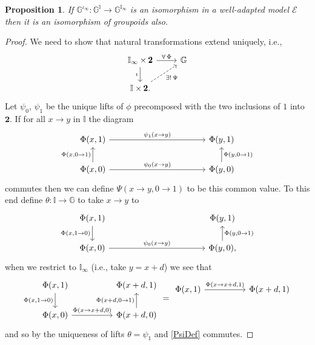 \documentclass[pdftex]{sigma}
\numberwithin{equation}{section}
\newtheorem{Proposition}[Theorem]{Proposition}
{ \theoremstyle{definition}
\newtheorem{Definition}[Theorem]{Definition}
\newtheorem{Notation}[Theorem]{Notation}
\newtheorem{Example}[Theorem]{Example}
\newtheorem{Remark}[Theorem]{Remark} }
\begin{document}
\begin{Proposition}\label{prop:groupoid-enriched-integration}
If $\mathbb{G}^{\iota_{\infty}}\colon \mathbb{G}^{\mathbb{I}}\rightarrow\mathbb{G}^{\mathbb{I}_{\infty}}$ is an isomorphism in a well-adapted model $\mathcal{E}$ then it is an isomorphism of groupoids also.
\end{Proposition}
\begin{proof}
We need to show that natural transformations extend uniquely, i.e.,
\begin{equation*}\begin{tikzcd}
\mathbb{I}_{\infty}\times\pmb{2} \rar{\forall\,\Phi} \dar[swap]{\iota} & \mathbb{G} \\
\mathbb{I}\times\pmb{2}. \urar[dashed][swap]{\exists!\,\Psi} &
\end{tikzcd}
\end{equation*}
Let $\psi_{0}$, $\psi_{1}$ be the unique lifts of $\phi$ precomposed with the two inclusions of $1$ into $\pmb{2}$. If for all $x\rightarrow y$ in $\mathbb{I}$ the diagram
\begin{equation}\label{PsiDef}
	\begin{tikzcd}[column sep=4cm]
\Phi(x,1) \rar{\psi_{1}(x\rightarrow y)} \dar[leftarrow,swap]{\Phi(x,0\rightarrow 1)} & \Phi(y,1) \dar[leftarrow]{\Phi(y,0\rightarrow 1)} \\
\Phi(x,0) \rar{\psi_{0}(x\rightarrow y)} & \Phi(y,0)
\end{tikzcd}
\end{equation}
commutes then we can def\/ine $\Psi(x\rightarrow y,0\rightarrow 1)$ to be this common value. To this end def\/ine $\theta\colon \mathbb{I}\rightarrow \mathbb{G}$ to take $x\rightarrow y$ to
\begin{equation*}\begin{tikzcd}[column sep=4cm]
\Phi(x,1) \dar[swap]{\Phi(x,1\rightarrow 0)} & \Phi(y,1) \dar[leftarrow]{\Phi(y,0\rightarrow 1)} \\
\Phi(x,0) \rar{\psi_{0}(x\rightarrow y)} & \Phi(y,0),
\end{tikzcd}
\end{equation*}
when we restrict to $\mathbb{I}_{\infty}$ (i.e., take $y=x+d$) we see that
\begin{equation*}\begin{tikzcd}[column sep=1.7cm]
\Phi(x,1) \dar[swap]{\Phi(x,1\rightarrow 0)} & \Phi(x+d,1) \dar[swap,leftarrow]{\Phi(x+d,0\rightarrow 1)} \\
\Phi(x,0) \rar{\Phi(x\rightarrow x+d,0)} & \Phi(x+d,0)
\end{tikzcd}
=
\begin{tikzcd}[column sep=1.7cm]
\Phi(x,1) \rar{\Phi(x\rightarrow x+d,1)} & \Phi(x+d,1) \\
{} & {}
\end{tikzcd}
\end{equation*}
and so by the uniqueness of lifts $\theta=\psi_{1}$ and \eqref{PsiDef} commutes.
\end{proof}
\end{document}
